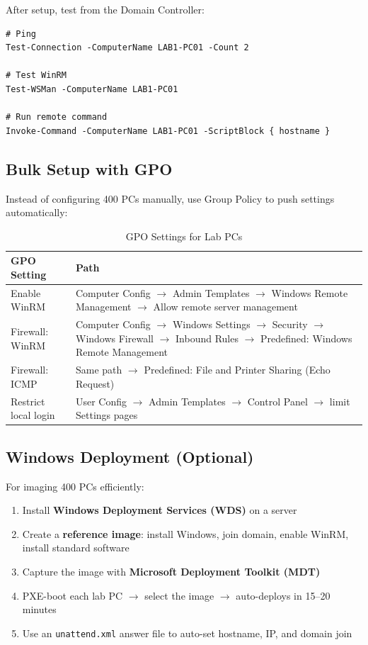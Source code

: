 ﻿\documentclass[12pt,a4paper]{article}
\begin{document}
After setup, test from the Domain Controller:

\begin{lstlisting}
# Ping
Test-Connection -ComputerName LAB1-PC01 -Count 2

# Test WinRM
Test-WSMan -ComputerName LAB1-PC01

# Run remote command
Invoke-Command -ComputerName LAB1-PC01 -ScriptBlock { hostname }
\end{lstlisting}

\subsection{Bulk Setup with GPO}

Instead of configuring 400 PCs manually, use Group Policy to push settings automatically:

\begin{table}[H]
\centering
\begin{tabularx}{\textwidth}{l X}
\toprule
\textbf{GPO Setting} & \textbf{Path} \\
\midrule
Enable WinRM & Computer Config $\rightarrow$ Admin Templates $\rightarrow$ Windows Remote Management $\rightarrow$ Allow remote server management \\
Firewall: WinRM & Computer Config $\rightarrow$ Windows Settings $\rightarrow$ Security $\rightarrow$ Windows Firewall $\rightarrow$ Inbound Rules $\rightarrow$ Predefined: Windows Remote Management \\
Firewall: ICMP & Same path $\rightarrow$ Predefined: File and Printer Sharing (Echo Request) \\
Restrict local login & User Config $\rightarrow$ Admin Templates $\rightarrow$ Control Panel $\rightarrow$ limit Settings pages \\
\bottomrule
\end{tabularx}
\caption{GPO Settings for Lab PCs}
\end{table}

\subsection{Windows Deployment (Optional)}

For imaging 400 PCs efficiently:

\begin{enumerate}
    \item Install \textbf{Windows Deployment Services (WDS)} on a server
    \item Create a \textbf{reference image}: install Windows, join domain, enable WinRM, install standard software
    \item Capture the image with \textbf{Microsoft Deployment Toolkit (MDT)}
    \item PXE-boot each lab PC $\rightarrow$ select the image $\rightarrow$ auto-deploys in 15--20 minutes
    \item Use an \texttt{unattend.xml} answer file to auto-set hostname, IP, and domain join
\end{enumerate}
\end{document}
